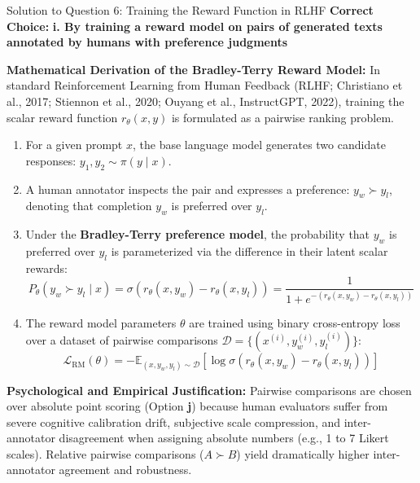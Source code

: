 \documentclass[11pt,a4paper]{article}
\begin{document}
\begin{solutionbox}{Solution to Question 6: Training the Reward Function in RLHF}
\textbf{Correct Choice:} \textbf{i. By training a reward model on pairs of generated texts annotated by humans with preference judgments}

\medskip
\noindent
\textbf{Mathematical Derivation of the Bradley-Terry Reward Model:}
In standard Reinforcement Learning from Human Feedback (RLHF; Christiano et al., 2017; Stiennon et al., 2020; Ouyang et al., InstructGPT, 2022), training the scalar reward function $r_\theta(x, y)$ is formulated as a pairwise ranking problem.
\begin{enumerate}[leftmargin=1.5em]
    \item For a given prompt $x$, the base language model generates two candidate responses: $y_1, y_2 \sim \pi(y \mid x)$.
    \item A human annotator inspects the pair and expresses a preference: $y_w \succ y_l$, denoting that completion $y_w$ is preferred over $y_l$.
    \item Under the \textbf{Bradley-Terry preference model}, the probability that $y_w$ is preferred over $y_l$ is parameterized via the difference in their latent scalar rewards:
    \begin{equation*}
        P_\theta(y_w \succ y_l \mid x) = \sigma\left( r_\theta(x, y_w) - r_\theta(x, y_l) \right) = \frac{1}{1 + e^{-(r_\theta(x, y_w) - r_\theta(x, y_l))}}
    \end{equation*}
    \item The reward model parameters $\theta$ are trained using binary cross-entropy loss over a dataset of pairwise comparisons $\mathcal{D} = \{(x^{(i)}, y_w^{(i)}, y_l^{(i)})\}$:
    \begin{equation*}
        \mathcal{L}_{\text{RM}}(\theta) = - \mathbb{E}_{(x, y_w, y_l) \sim \mathcal{D}} \left[ \log \sigma\left( r_\theta(x, y_w) - r_\theta(x, y_l) \right) \right]
    \end{equation*}
\end{enumerate}

\medskip
\noindent
\textbf{Psychological and Empirical Justification:}
Pairwise comparisons are chosen over absolute point scoring (Option \textbf{j}) because human evaluators suffer from severe cognitive calibration drift, subjective scale compression, and inter-annotator disagreement when assigning absolute numbers (e.g., 1 to 7 Likert scales). Relative pairwise comparisons ($A \succ B$) yield dramatically higher inter-annotator agreement and robustness.


\end{solutionbox}
\end{document}
